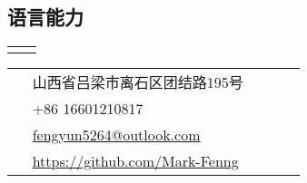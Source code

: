 \documentclass[10pt]{article} %
\begin{document}
\begin{paracol}{2}

\section{语言能力}





\begin{supertabular}{rl} %
	
	
	
	
	
	
\end{supertabular}


\switchcolumn %


\parbox[top][0.12\textheight][c]{\linewidth}{ %
	\vspace{-0.04\textheight} %
	\colorbox{shade}{ %
		\begin{supertabular}{p{0.05\linewidth}|p{0.775\linewidth}} %
			\raisebox{-1pt}{\faHome} & \small{山西省吕梁市离石区团结路195号} \\ %
			\raisebox{-1pt}{\faPhone} & +86 16601210817 \\ %
			\raisebox{0pt}{\small\faEnvelope} & \href{mailto:fengyun5264@outlook.com}{fengyun5264@outlook.com} \\ %
			\raisebox{-1pt}{\faGithub} & \href{https://github.com/Mark-Fenng}{https://github.com/Mark-Fenng} \\ %
		\end{supertabular}
	}
}


\end{paracol}
\end{document}
